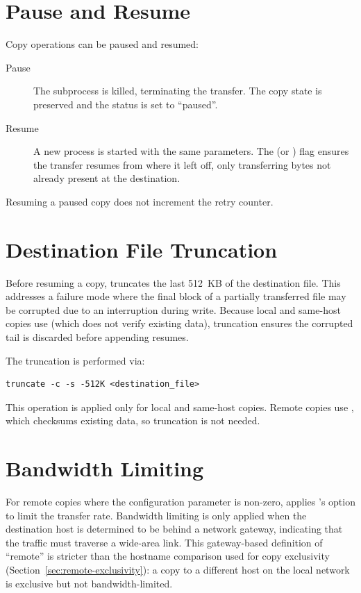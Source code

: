 \section{Pause and Resume}

Copy operations can be paused and resumed:

\begin{description}
    \item[Pause] The  subprocess is killed, terminating the transfer. The copy state is preserved and the status is set to ``paused''.

    \item[Resume] A new  process is started with the same parameters. The  (or ) flag ensures the transfer resumes from where it left off, only transferring bytes not already present at the destination.
\end{description}

Resuming a paused copy does not increment the retry counter.

\section{Destination File Truncation}
\label{sec:truncation}

Before resuming a copy, \SC{} truncates the last 512~KB of the destination file. This addresses a failure mode where the final block of a partially transferred file may be corrupted due to an interruption during write. Because local and same-host copies use  (which does not verify existing data), truncation ensures the corrupted tail is discarded before appending resumes.

The truncation is performed via:
\begin{lstlisting}
truncate -c -s -512K <destination_file>
\end{lstlisting}

This operation is applied only for local and same-host copies. Remote copies use , which checksums existing data, so truncation is not needed.

\section{Bandwidth Limiting}
\label{sec:bw-gateway-detection}

For remote copies where the  configuration parameter is non-zero, \SC{} applies 's  option to limit the transfer rate. Bandwidth limiting is only applied when the destination host is determined to be behind a network gateway, indicating that the traffic must traverse a wide-area link. This gateway-based definition of ``remote'' is stricter than the hostname comparison used for copy exclusivity (Section~\ref{sec:remote-exclusivity}): a copy to a different host on the local network is exclusive but not bandwidth-limited.

